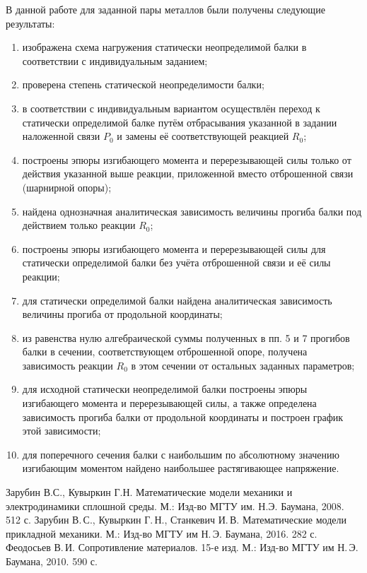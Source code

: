 \documentclass[12pt, a4paper]{article}
\begin{document}
В данной работе для заданной пары металлов были получены следующие результаты:
\begin{enumerate}
\item изображена схема нагружения статически неопределимой балки в соответствии с индивидуальным заданием;

\item проверена степень статической неопределимости балки;

\item в соответствии с индивидуальным вариантом осуществлён переход к статически определимой балке путём отбрасывания указанной в задании наложенной связи $P_0$ и замены её соответствующей реакцией $R_0$; 

\item построены эпюры изгибающего момента и перерезывающей силы только от действия указанной выше реакции, приложенной вместо отброшенной связи (шарнирной опоры);

\item найдена однозначная аналитическая зависимость величины прогиба балки под действием только реакции $R_0$;

\item построены эпюры изгибающего момента и перерезывающей силы для статически определимой балки без учёта отброшенной связи и её силы реакции;

\item для статически определимой балки найдена аналитическая зависимость величины прогиба от продольной координаты;

\item из равенства нулю алгебраической суммы полученных в пп. 5 и 7 прогибов балки в сечении, соответствующем отброшенной опоре, получена зависимость реакции $R_0$ в этом сечении от остальных заданных параметров;

\item для исходной статически неопределимой балки построены эпюры изгибающего момента и перерезывающей силы, а также определена зависимость прогиба балки от продольной координаты и построен график этой зависимости;

\item для поперечного сечения балки с наибольшим по абсолютному значению изгибающим моментом найдено наибольшее растягивающее напряжение.

\end{enumerate}

\newpage
\begin{thebibliography}{2}
 Зарубин В.С., Кувыркин Г.Н. Математические модели механики и электродинамики сплошной среды. М.: Изд-во МГТУ им. Н.Э. Баумана, 2008. 512 с.
 Зарубин В.\,С., Кувыркин Г.\,Н., Станкевич И.\,В. Математические модели прикладной механики. М.: Изд-во МГТУ им Н.\,Э. Баумана, 2016. 282 с.
 Феодосьев В.\,И. Сопротивление материалов. 15-е изд. М.: Изд-во МГТУ им Н.\,Э. Баумана, 2010. 590 с.
\end{thebibliography}
\end{document}

